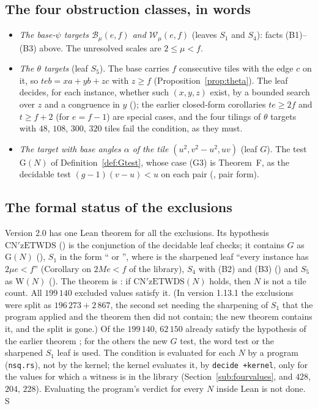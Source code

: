 \documentclass[11pt,reqno]{amsart}
\theoremstyle{plain}
\theoremstyle{definition}
\newcommand{\sS}{\textup{\textsf{S}}}
\begin{document}
\subsection{The four obstruction classes, in words}
\begin{itemize}
\item \emph{The base-$\psi$ targets $\mathcal B_\mu(e,f)$ and $\mathcal W_\mu(e,f)$} (leaves $S_1$ and $S_4$): facts (B1)--(B3) above. The unresolved scales are $2\le \mu<f$.
\item \emph{The $\theta$ targets} (leaf $S_5$). The base carries $f$ consecutive
tiles with the edge $c$ on it, so $teb=xa+yb+zc$ with $z\ge f$ (Proposition~\ref{prop:theta}). The leaf
decides, for each instance, whether such $(x,y,z)$ exist, by a bounded search over $z$ and a congruence in $y$
(); the earlier closed-form corollaries $te\ge2f$ and $t\ge f+2$ (for $e=f-1$) are special cases, and the four tilings of
$\theta$ targets with $48$, $108$, $300$, $320$ tiles fail the condition, as they must.
\item \emph{The target with base angles $\alpha$ of the tile $(u^2,v^2-u^2,uv)$} (leaf $G$). The test $\mathrm{G}(N)$ of Definition~\ref{def:Gtest}, whose case (G3) is Theorem~F, as the decidable test $(g-1)(v-u)<u$ on each pair
(, pair form).
\end{itemize}

\subsection{The formal status of the exclusions}\label{sub:status}
Version 2.0 has one Lean theorem for all the exclusions. Its hypothesis $\mathrm{CN'zETWDS}$ () is the conjunction of the decidable leaf checks; it contains $G$ as $\mathrm G(N)$ (), $S_1$ in the form `` or '', where  is the sharpened leaf ``every instance has $2\mu e<f$'' (Corollary on $2Me<f$ of the library), $S_4$ with (B2) and (B3) () and $S_5$ as $\mathrm{W}(N)$ (). The theorem is
: if $\mathrm{CN'zETWDS}(N)$ holds, then $N$ is not a tile count.
All $199\,140$ excluded values satisfy it. (In version 1.13.1 the exclusions were split as $196\,273+2\,867$, the second set needing the sharpening of $S_1$ that the program applied and the theorem then did not contain; the new theorem contains it, and the split is gone.) Of the $199\,140$, $62\,150$ already satisfy the hypothesis of the earlier theorem ; for the others the new $G$ test, the word test or the sharpened $S_1$ leaf is used.
The condition is evaluated for each $N$ by a program (\texttt{nsq.rs}), not by the kernel; the kernel evaluates it, by \texttt{decide +kernel}, only for the values for which a witness is in the library (Section~\ref{sub:fourvalues}, and $428$, $204$, $228$). Evaluating the program's verdict for every $N$ inside Lean is not done. \sS
\end{document}
